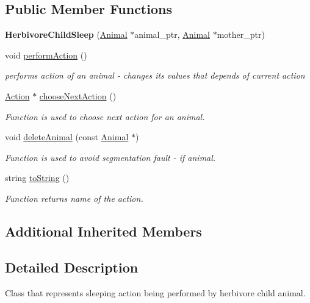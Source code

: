\subsection*{Public Member Functions}
\begin{DoxyCompactItemize}
\item 
\hypertarget{class_herbivore_child_sleep_a3572b60d249a2b4b0e50cc01f11db670}{}{\bfseries Herbivore\+Child\+Sleep} (\hyperlink{class_animal}{Animal} $\ast$animal\+\_\+ptr, \hyperlink{class_animal}{Animal} $\ast$mother\+\_\+ptr)\label{class_herbivore_child_sleep_a3572b60d249a2b4b0e50cc01f11db670}

\item 
void \hyperlink{class_herbivore_child_sleep_afeffdc6f6dc5e18a63554b5f0bcb939b}{perform\+Action} ()
\begin{DoxyCompactList}\small\item\em performs action of an animal -\/ changes it\textquotesingle{}s values that depends of current action \end{DoxyCompactList}\item 
\hyperlink{class_action}{Action} $\ast$ \hyperlink{class_herbivore_child_sleep_aad20bdafd64ddb56a99d810953de76aa}{choose\+Next\+Action} ()
\begin{DoxyCompactList}\small\item\em Function is used to choose next action for an animal. \end{DoxyCompactList}\item 
void \hyperlink{class_herbivore_child_sleep_ac6c2c78f023c552cf90076f179256d5a}{delete\+Animal} (const \hyperlink{class_animal}{Animal} $\ast$)
\begin{DoxyCompactList}\small\item\em Function is used to avoid segmentation fault -\/ if animal. \end{DoxyCompactList}\item 
string \hyperlink{class_herbivore_child_sleep_a64f782ef578f2f97342819d25c96a410}{to\+String} ()
\begin{DoxyCompactList}\small\item\em Function returns name of the action. \end{DoxyCompactList}\end{DoxyCompactItemize}
\subsection*{Additional Inherited Members}


\subsection{Detailed Description}
Class that represents sleeping action being performed by herbivore child animal. 

